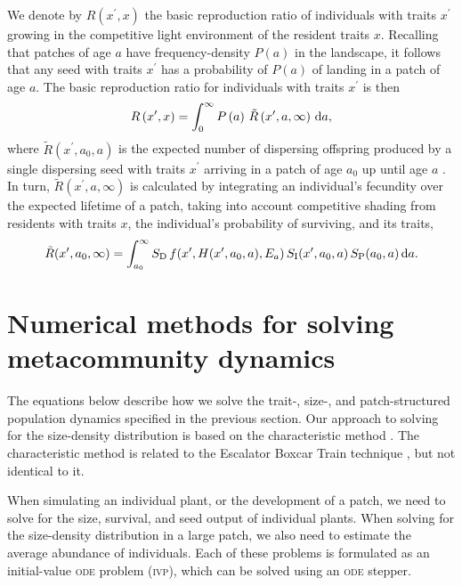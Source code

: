 \documentclass[10pt,twoside]{article}
\begin{document}
We denote by \(R\left(x^\prime, x\right)\) the basic reproduction ratio of
individuals with traits \(x^\prime\) growing in the competitive
light environment of the resident traits \(x\). Recalling that patches of age
\(a\) have frequency-density \(P(a)\) in the landscape, it follows that any seed
with traits \(x^\prime\) has a probability of \(P(a)\) of landing in a patch of age
\(a\). The basic reproduction ratio for individuals with traits
\(x^\prime\) is then
\begin{equation} \label{eq:InvFit}
R\left(x^\prime,x\right) = \int _0^{\infty} P\left(a\right) \, \tilde{R}\left(x^\prime, a, \infty \right) \, {\rm d}a ,
\end{equation}
where \(\tilde{R}\left(x^\prime, a_0, a \right)\) is the expected number
of dispersing offspring produced by a single dispersing seed with traits \(x^\prime\) arriving in
a patch of age \(a_0\) up until age \(a\)
\citep{Gyllenberg-2001, Metz-2001}.
In turn, \(\tilde{R}\left(x^\prime, a,\infty\right)\) is calculated by integrating
an individual's fecundity over the expected lifetime of a patch, taking
into account competitive shading from residents with traits \(x\), the
individual's probability of surviving, and its traits,
\begin{equation} \label{eq:tildeR}
\tilde{R}(x^\prime, a_0, \infty) = \int_{a_0}^{\infty} S_{\rm D} \, f(x^\prime, H(x^\prime, a_0, a), E_{a}) \, S_{\rm I} (x^\prime, a_0, a) \, S_{\rm P} (a_0, a) \, {\rm d} a.
\end{equation}

\section{Numerical methods for solving metacommunity dynamics}

The equations below describe how we solve the trait-, size-, and patch-structured
population dynamics specified in the previous section.
Our approach to solving for the size-density distribution is based on the characteristic method \citep{Angulo-2004,Angulo-2014,Angulo-2016}. The characteristic method is related to
the Escalator Boxcar Train technique
\citep{Deroos-1988, Deroos-1997, Deroos-1992}, but not identical to it.

When simulating an individual plant, or the development of a
patch, we need to solve for the size, survival, and seed
output of individual plants. When solving for the size-density distribution
in a large patch, we also need to estimate the average abundance of individuals.
Each of these problems is formulated as an initial-value \textsc{ode} problem
(\textsc{ivp}), which can be solved using an \textsc{ode} stepper.
\end{document}
